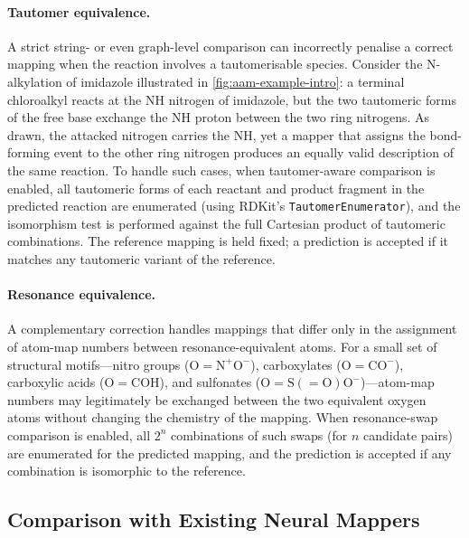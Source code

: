 \documentclass[12pt]{article}
\begin{document}
\paragraph{Tautomer equivalence.}
A strict string- or even graph-level comparison can incorrectly
penalise a correct mapping when the reaction involves a tautomerisable
species.  Consider the N-alkylation of imidazole illustrated in
\cref{fig:aam-example-intro}: a terminal chloroalkyl reacts at the
NH nitrogen of imidazole, but the two tautomeric forms of the free
base exchange the NH proton between the two ring nitrogens.  As drawn,
the attacked nitrogen carries the NH, yet a mapper that assigns the
bond-forming event to the other ring nitrogen produces an equally
valid description of the same reaction.  To handle such cases,
when tautomer-aware comparison is enabled, all tautomeric forms of
each reactant and product fragment in the predicted reaction are
enumerated (using RDKit's \texttt{TautomerEnumerator}), and the
isomorphism test is performed against the full Cartesian product of
tautomeric combinations.  The reference mapping is held fixed; a
prediction is accepted if it matches any tautomeric variant of the
reference.

\paragraph{Resonance equivalence.}
A complementary correction handles mappings that differ only in the
assignment of atom-map numbers between resonance-equivalent atoms.
For a small set of structural motifs---nitro groups
($\mathrm{O{=}N^{+}O^{-}}$), carboxylates ($\mathrm{O{=}CO^{-}}$),
carboxylic acids ($\mathrm{O{=}COH}$), and sulfonates
($\mathrm{O{=}S({=}O)O^{-}}$)---atom-map numbers may legitimately
be exchanged between the two equivalent oxygen atoms without changing
the chemistry of the mapping.  When resonance-swap comparison is
enabled, all $2^n$ combinations of such swaps (for $n$ candidate
pairs) are enumerated for the predicted mapping, and the prediction is
accepted if any combination is isomorphic to the reference.

\subsection{Comparison with Existing Neural Mappers}
\label{subsec:comparison}
\end{document}
